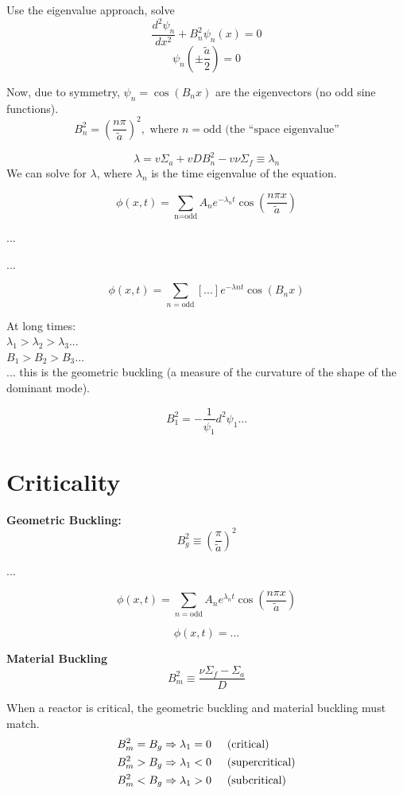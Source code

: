 \documentclass{report}
\newcommand{\h}[1]{\section*{#1}}
\newcommand{\Xs}{\Sigma}
\begin{document}
Use the eigenvalue approach, solve
$$ \frac{d^2\psi_n}{dx^2} + B_n^2\psi_n(x)=0 $$
$$ \psi_n(\pm\frac{\tilde{a}}{2}) = 0 $$

Now, due to symmetry, $\psi_n = \cos(B_n x)$ are the eigenvectors (no odd sine functions).
$$ B_n^2 = \left( \frac{n\pi}{\tilde{a}} \right)^2, \text{ where }n=\text{odd (the ``space eigenvalue''} $$

$$ \lambda = v \Xs_a + vDB_n^2 - v\nu\Xs_f \equiv \lambda_n $$
We can solve for $\lambda$, where $\lambda_n$ is the time eigenvalue of the equation.

$$ \phi(x,t) = \sum_{\text{n=odd}} A_n e^{-\lambda_n t}\cos\left(\frac{n \pi x}{\tilde{a}}\right)$$

...

...

$$ \phi(x,t) = \sum_{n=\text{odd}} \left[ ... \right]e^{-\lambda n t}\cos(B_n x)  $$

At long times: \\
$\lambda_1 > \lambda_2 > \lambda_3 ...$ \\
$B_1 > B_2 > B_3 ...$ \\
... this is the geometric buckling (a measure of the curvature of the shape of the dominant mode). 

$$ B_1^2 = -\frac{1}{\psi_1}{d^2\psi_1}{...} $$



\h{Criticality}

\textbf{Geometric Buckling:}
$$ B_g^2 \equiv \left(\frac{\pi}{\tilde{a}}\right)^2 $$

...

$$ \phi(x,t) = \sum_{n=\text{odd}} A_n e^{\lambda_n t} \cos\left(\frac{n\pi x}{\tilde{a}}\right) $$

$$ \phi(x,t) = ... $$

\textbf{Material Buckling}
$$ B_m^2 \equiv \frac{\nu \Xs_f-\Xs_a}{D} $$

When a reactor is critical, the geometric buckling and material buckling must match.
\begin{align*}
& B_m^2 = B_g \Rightarrow \lambda_1 = 0 \hspace{0.5cm} \text{(critical)} \\
& B_m^2 > B_g \Rightarrow \lambda_1 < 0 \hspace{0.5cm} \text{(supercritical)} \\
& B_m^2 < B_g \Rightarrow \lambda_1 > 0 \hspace{0.5cm} \text{(subcritical)} 
\end{align*}
\end{document}
